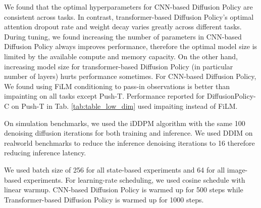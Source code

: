We found that the optimal hyperparameters for CNN-based Diffusion Policy are consistent across tasks. In contrast, transformer-based Diffusion Policy's optimal attention dropout rate and weight decay varies greatly across different tasks. During tuning, we found increasing the number of parameters in CNN-based Diffusion Policy always improves performance, therefore the optimal model size is limited by the available compute and memory capacity. On the other hand, increasing model size for transformer-based Diffusion Policy (in particular number of layers) hurts performance sometimes. For CNN-based Diffusion Policy, We found using FiLM conditioning to pass-in observations is better than impainting on all tasks except Push-T. Performance reported for DiffusionPolicy-C on Push-T in Tab. \ref{tab:table_low_dim} used impaiting instead of FiLM.

On simulation benchmarks, we used the iDDPM algorithm \cite{nichol2021improved} with the same 100 denoising diffusion iterations for both training and inference. We used DDIM \cite{song2021ddim} on realworld benchmarks to reduce the inference denoising iterations to 16 therefore reducing inference latency.

We used batch size of 256 for all state-based experiments and 64 for all image-based experiments. For learning-rate scheduling, we used cosine schedule with linear warmup. CNN-based Diffusion Policy is warmed up for 500 steps while Transformer-based Diffusion Policy is warmed up for 1000 steps.

\begin{table}
\centering

\caption{
\textbf{Hyperparameters for CNN-based Diffusion Policy}
\label{tab:hparam_cnn}
Ctrl: position or velocity control 
To: observation horizon 
Ta: action horizon 
Tp: action prediction horizon 
ImgRes: environment observation resolution (Camera views x W x H) 
CropRes: random crop resolution 
\#D-Params: diffusion network number of parameters in millions 
\#V-Params: vision encoder number of parameters in millions 
Lr: learining rate 
WDecay: weight decay
D-Iters Train: number of training diffusion iterations
D-Iters Eval: number of inference diffusion iterations (enabled by DDIM \cite{song2021ddim})
}

\vspace{4mm}
\centering

\caption{
\textbf{Hyperparameters for Transformer-based Diffusion Policy}
\label{tab:hparam_transformer}
Ctrl: position or velocity control 
To: observation horizon 
Ta: action horizon 
Tp: action prediction horizon 
\#D-Params: diffusion network number of parameters in millions 
\#V-Params: vision encoder number of parameters in millions 
Emb Dim: transformer token embedding dimension
Attn Drp: transformer attention dropout probability
Lr: learining rate 
WDecay: weight decay (for transformer only)
D-Iters Train: number of training diffusion iterations
D-Iters Eval: number of inference diffusion iterations (enabled by DDIM \cite{song2021ddim})
}
\vspace{-5mm}
\end{table}

